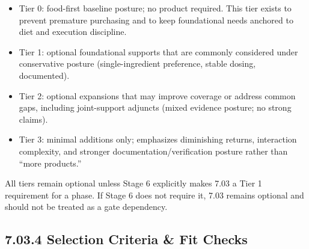 \documentclass[10pt]{article}
\begin{document}
\begin{itemize}
\item Tier 0: food-first baseline posture; no product required. This tier exists to prevent premature purchasing and to keep foundational needs anchored to diet and execution discipline.
\item Tier 1: optional foundational supports that are commonly considered under conservative posture (single-ingredient preference, stable dosing, documented).
\item Tier 2: optional expansions that may improve coverage or address common gaps, including joint-support adjuncts (mixed evidence posture; no strong claims).
\item Tier 3: minimal additions only; emphasizes diminishing returns, interaction complexity, and stronger documentation/verification posture rather than “more products.”
\end{itemize}

All tiers remain optional unless Stage 6 explicitly makes 7.03 a Tier 1 requirement for a phase. If Stage 6 does not require it, 7.03 remains optional and should not be treated as a gate dependency.

\subsection*{7.03.4 Selection Criteria \& Fit Checks}
{}
\end{document}
